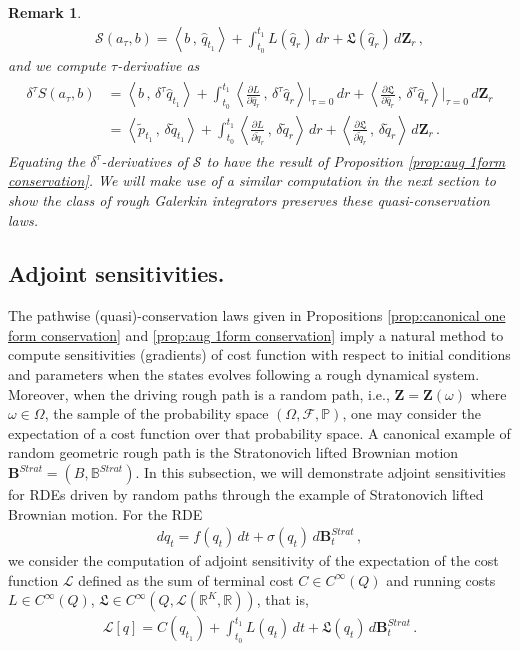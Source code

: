 \documentclass[11pt, oneside]{article}
\numberwithin{equation}{section}
\newtheorem{remark}{Remark}[section]
\theoremstyle{definition}
\newcommand{\wt}[1]{\widetilde{#1}}
\newcommand{\wh}[1]{\widehat{#1}}
\newcommand{\mc}[1]{\mathcal{#1}}
\newcommand{\mcal}[1]{\mc{#1}}
\newcommand{\scp}[2]{{\left\langle {#1}\, , \, {#2}\right\rangle}}
\def\p{{\partial}}
\def\p{\partial}
\begin{document}
\begin{remark}
    \begin{align*}
        \mathcal{S}(a_\tau, b) = \scp{b}{\wh{q}_{t_1}} + \int_{t_0}^{t_1}L(\wh{q}_r)\,dr + \mathfrak{L}(\wh{q}_r)\,d\mathbf{Z}_r\,, 
    \end{align*}
    and we compute $\tau$-derivative as
    \begin{align*}
        \begin{split}
            \delta^\tau S(a_\tau, b) &= \scp{b}{\delta^\tau \wh{q}_{t_1}} + \int_{t_0}^{t_1} \scp{\frac{\p L}{\p \wh{q}_r}}{\delta^\tau \wh{q}_r}\biggr|_{\tau=0}\,dr + \scp{\frac{\p \mathfrak{L}}{\p \wh{q}_r}}{\delta^\tau \wh{q}_r}\biggr|_{\tau=0}\,d\mathbf{Z}_r\\
            &= \scp{\wt{p}_{t_1}}{\delta \wt{q}_{t_1}} + \int_{t_0}^{t_1} \scp{\frac{\p L}{\p \wt{q}_r}}{\delta\wt{q}_r}\,dr + \scp{\frac{\p \mathfrak{L}}{\p \wt{q}_r}}{\delta \wt{q}_r}\,d\mathbf{Z}_r\,.
        \end{split}
    \end{align*}
    Equating the $\delta^\tau$-derivatives of $\mcal{S}$ to have the result of Proposition \ref{prop:aug 1form conservation}. We will make use of a similar computation in the next section to show the class of rough Galerkin integrators preserves these quasi-conservation laws.
\end{remark}

\subsection{Adjoint sensitivities.}\label{sec:cts rough adjoints sensitivities}
The pathwise (quasi)-conservation laws given in Propositions \ref{prop:canonical one form conservation} and \ref{prop:aug 1form conservation} imply a natural method to compute sensitivities (gradients) of cost function with respect to initial conditions and parameters when the states evolves following a rough dynamical system. Moreover, when the driving rough path is a random path, i.e., $\mathbf{Z} = \mathbf{Z}(\omega)$ where $\omega \in \Omega$, the sample of the probability space $(\Omega, \mcal{F}, \mathbb{P})$, one may consider the expectation of a cost function over that probability space. A canonical example of random geometric rough path is the Stratonovich lifted Brownian motion $\mathbf{B}^{Strat} = (B, \mathbb{B}^{Strat})$. In this subsection, we will demonstrate adjoint sensitivities for RDEs driven by random paths through the example of Stratonovich lifted Brownian motion. For the RDE
\begin{align}
    dq_t = f(q_t)\,dt + \sigma(q_t)\, d\mathbf{B}^{Strat}_t \,, 
    \label{eq:basic rde strat}
\end{align}
we consider the computation of adjoint sensitivity of the expectation of the cost function $\mcal{L}$ defined as the sum of terminal cost $C\in C^\infty(Q)$ and running costs $L \in C^\infty(Q)$, $\mathfrak{L}\in C^\infty(Q, \mcal{L}(\mathbb{R}^K,\mathbb{R}))$, that is, 
\begin{align}
    \mcal{L}[q] = C(q_{t_1}) + \int_{t_0}^{t_1} L(q_t)\,dt + \mathfrak{L}(q_t)\,d\mathbf{B}^{Strat}_t\,.
\end{align}
\end{document}
